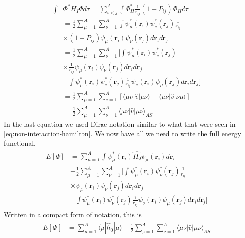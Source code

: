 \documentclass[11pt]{article}
\begin{document}
\begin{align*}
	\int &\Phi^* H_I \Phi d\tau = \sum^A_{i<j} \int \Phi_H^* \frac{1}{r_{ij}} (1 - P_{ij}) \Phi_H d\tau  \\
	&= \frac{1}{2}\sum^A_{\mu=1}\sum^A_{\nu=1} \int \psi_\mu^*(\mathbf{r}_i)\psi_\nu^*(\mathbf{r}_j) \frac{1}{r_{ij}} \\ 
	&\times (1 - P_{ij}) \psi_\mu(\mathbf{r}_i)\psi_\nu(\mathbf{r}_j) d\mathbf{r}_i d\mathbf{r}_j \\
	&= \frac{1}{2}\sum^A_{\mu=1}\sum^A_{\nu=1} \bigg[ \int \psi_\mu^*(\mathbf{r}_i)\psi_\nu^*(\mathbf{r}_j) \\
	&\times \frac{1}{r_{ij}} \psi_\mu(\mathbf{r}_i)\psi_\nu(\mathbf{r}_j) d\mathbf{r}_i d\mathbf{r}_j \\ 
	&- \int \psi_\mu^*(\mathbf{r}_i)\psi_\nu^*(\mathbf{r}_j) \frac{1}{r_{ij}} \psi_\nu(\mathbf{r}_i) \psi_\mu(\mathbf{r}_j) d\mathbf{r}_i d\mathbf{r}_j \bigg] \\
	&= \frac{1}{2}\sum^A_{\mu=1}\sum^A_{\nu=1} \left[ \langle\mu\nu|\hat{v}|\mu\nu\rangle - \langle\mu\nu|\hat{v}|\nu\mu\rangle \right] \\
	&= \frac{1}{2}\sum^A_{\mu=1}\sum^A_{\nu=1} \langle\mu\nu|\hat{v}|\mu\nu\rangle_{AS}
\end{align*}
In the last equation we used Dirac notation similar to what that were seen in \eqref{eq:non-interaction-hamilton}. We now have all we need to write the full energy functional,
\begin{align}
	\begin{split}
		E[\Phi] &= \sum^A_{\mu=1} \int \psi^*_\mu(\mathbf{r}_i) \hat{H_0} \psi_\mu(\mathbf{r}_i) d\mathbf{r}_i \\
		&+ \frac{1}{2}\sum^A_{\mu=1}\sum^A_{\nu=1} \bigg[ \int \psi_\mu^*(\mathbf{r}_i)\psi_\nu^*(\mathbf{r}_j) \frac{1}{r_{ij}} \\ 
		&\times \psi_\mu(\mathbf{r}_i)\psi_\nu(\mathbf{r}_j) d\mathbf{r}_i d\mathbf{r}_j \\ 
		&- \int \psi_\mu^*(\mathbf{r}_i)\psi_\nu^*(\mathbf{r}_j) \frac{1}{r_{ij}} \psi_\nu(\mathbf{r}_i) \psi_\mu(\mathbf{r}_j) d\mathbf{r}_i d\mathbf{r}_j \bigg]
	\label{eq:energy-functional}
	\end{split}
\end{align}
Written in a compact form of notation, this is
\begin{align}
	\begin{split}
		E[\Phi] &= \sum^A_{\mu=1} \langle \mu |\hat{h}_0|\mu\rangle + \frac{1}{2}\sum^A_{\mu=1}\sum^A_{\nu=1} \langle\mu\nu|\hat{v}|\mu\nu\rangle_{AS}
	\label{eq:energy-functional-compact}
	\end{split}
\end{align}
\end{document}
